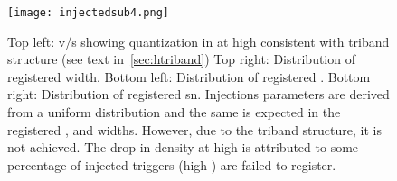 \begin{figure}
	\label{fig:injected}
	\texttt{[image: injectedsub4.png]}
	\caption{Top left: \dm v/s \wd showing quantization in \wd at high \dm consistent with triband structure (see text in~\autoref{sec:htriband})
		Top right: Distribution of registered width.
		Bottom left: Distribution of registered \dm.
		Bottom right: Distribution of registered sn.
		Injections parameters are derived from a uniform distribution and the same is expected in the registered \sn, \dm and widths.
		However, due to the triband structure, it is not achieved. The drop in density at high \sn is attributed to some percentage of injected triggers (high \dm) are failed to register.
	}
\end{figure}
